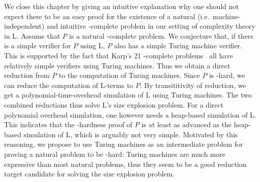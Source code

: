 \begin{remark}\label{rem:cook_L}
We close this chapter by giving an intuitive explanation why one should not expect there to be an easy proof for the existence of a natural (i.e.\ machine-independent) and intuitive \NP{}-complete problem in our setting of complexity theory in L.
Assume that $P$ is a natural \NP{}-complete problem. We conjecture that, if there is a simple verifier for $P$ using L, $P$ also has a simple Turing machine verifier. This is supported by the fact that Karp's 21 \NP{}-complete problems~\cite{Karp1972} all have relatively simple verifiers using Turing machines.
Thus we obtain a direct reduction from $P$ to the computation of Turing machines. 
Since $P$ is \NP{}-hard, we can reduce the computation of L-terms to $P$. By transititivity of reduction, we get a polynomial-time-overhead simulation of L using Turing machines. The two combined reductions thus solve L's size explosion problem. 
For a direct polynomial overhead simulation, one however needs a heap-based simulation of L.
This indicates that the \NP{}-hardness proof of $P$ is at least as advanced as the heap-based simulation of L, which is arguably not very simple.
Motivated by this reasoning, we propose to use Turing machines as an intermediate problem for proving a natural problem to be \NP{}-hard: Turing machines are much more expressive than most natural problems, thus they seem to be a good reduction target candidate for solving the size explosion problem.
\end{remark}
